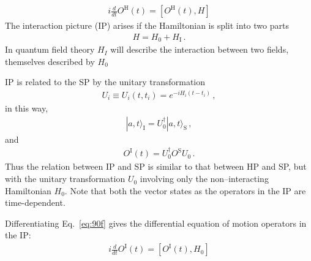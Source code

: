 \begin{align}
  i\frac{d}{dt}O^{\text{H}}(t)=\left[O^{\text{H}}(t),H\right]
\end{align}
The interaction picture (IP) arises if the Hamiltonian is split into two parts
\begin{align}
  H=H_0+H_{\text{I}}\,.
\end{align}
In quantum field theory $H_I$ will describe the interaction between two fields, themselves described by $H_0$

IP is related to the SP by the unitary transformation
\begin{align}
\label{eq:88f}
  U_i\equiv U_i(t,t_i)=e^{-i H_i(t-t_i)}\,,
\end{align}
in this way,
\begin{align}
\label{eq:89f}
  |a,t\rangle_{\text{I}}=U_0^\dagger|a,t\rangle_{\text{S}}\,,
\end{align}
and
\begin{align}
\label{eq:90f}
  O^{\text{I}}(t)=U^\dagger_0 O^{\text{S}}U_0\,.
\end{align}
Thus the relation between IP and SP is similar to that between HP and SP, but with the unitary transformation $U_0$ involving only the non--interacting Hamiltonian $H_0$. Note that both the vector states as the operators in the IP are time-dependent.

Differentiating Eq.~\eqref{eq:90f} gives the differential equation of motion operators in the IP:
\begin{align}
  i\frac{d}{dt}O^{\text{I}}(t)=\left[O^{\text{I}}(t),H_0\right]
\end{align}

